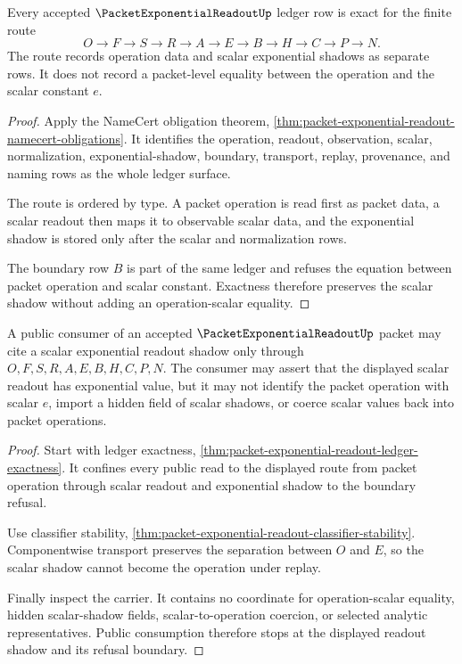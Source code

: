 \begin{theorem}
\label{thm:packet-exponential-readout-ledger-exactness}
Every accepted $\PacketExponentialReadoutUp$ ledger row is exact for the finite route
$$
O \to F \to S \to R \to A \to E \to B \to H \to C \to P \to N.
$$
The route records operation data and scalar exponential shadows as separate rows. It does not record a packet-level equality between the operation and the scalar constant $e$.
\end{theorem}
\begin{proof}
Apply the NameCert obligation theorem, \autoref{thm:packet-exponential-readout-namecert-obligations}. It identifies the operation, readout, observation, scalar, normalization, exponential-shadow, boundary, transport, replay, provenance, and naming rows as the whole ledger surface.

The route is ordered by type. A packet operation is read first as packet data, a scalar readout then maps it to observable scalar data, and the exponential shadow is stored only after the scalar and normalization rows.

The boundary row $B$ is part of the same ledger and refuses the equation between packet operation and scalar constant. Exactness therefore preserves the scalar shadow without adding an operation-scalar equality.
\end{proof}

\begin{theorem}
\label{thm:packet-exponential-readout-public-boundary}
A public consumer of an accepted $\PacketExponentialReadoutUp$ packet may cite a scalar exponential readout shadow only through $O,F,S,R,A,E,B,H,C,P,N$. The consumer may assert that the displayed scalar readout has exponential value, but it may not identify the packet operation with scalar $e$, import a hidden field of scalar shadows, or coerce scalar values back into packet operations.
\end{theorem}
\begin{proof}
Start with ledger exactness, \autoref{thm:packet-exponential-readout-ledger-exactness}. It confines every public read to the displayed route from packet operation through scalar readout and exponential shadow to the boundary refusal.

Use classifier stability, \autoref{thm:packet-exponential-readout-classifier-stability}. Componentwise transport preserves the separation between $O$ and $E$, so the scalar shadow cannot become the operation under replay.

Finally inspect the carrier. It contains no coordinate for operation-scalar equality, hidden scalar-shadow fields, scalar-to-operation coercion, or selected analytic representatives. Public consumption therefore stops at the displayed readout shadow and its refusal boundary.
\end{proof}

